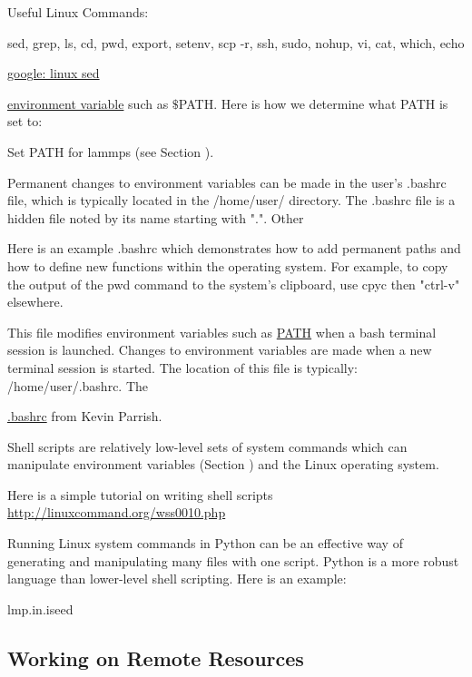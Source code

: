 Useful Linux Commands:

sed, grep, ls, cd, pwd, export, setenv, scp -r, ssh, sudo, nohup, 
vi, cat, which, echo

\href{https://www.google.com/search?q=linux+sed}
{google: linux sed} 


\href{http://en.wikipedia.org/wiki/Environment_variable}
{environment variable} such as $\$$PATH.  Here is how we determine what 
PATH is set to:


Set PATH for lammps (see Section ).


Permanent changes to environment variables can be made in the user's 
.bashrc file, which is typically located in the /home/user/ directory. 
The .bashrc file is a hidden file noted by its name starting with ".". 
Other

Here is an example .bashrc which demonstrates how to add permanent paths 
and how to define new functions within the operating system. 
For example, to copy the output of the pwd command to the system's 
clipboard, use cpyc then "ctrl-v" elsewhere. 

This file modifies environment variables such as 
\href{https://help.ubuntu.com/community/EnvironmentVariables}{PATH}  
when a bash terminal session is launched. Changes to environment 
variables are made when a new terminal session is started. The 
location of this file is typically: /home/user/.bashrc.  The 

\href{https://gist.github.com/kparrish/6064111}{.bashrc} from 
Kevin Parrish.


Shell scripts are relatively low-level sets of system commands 
which can manipulate environment variables (Section )   
and the Linux operating system. 

Here is a simple tutorial on writing shell scripts 
\href{http://linuxcommand.org/wss0010.php}
{http://linuxcommand.org/wss0010.php}

Running Linux system commands in Python can be an effective way of 
generating and manipulating many files with one script. Python 
is a more robust language than lower-level shell scripting. 
Here is an example:

lmp.in.iseed

\subsection{\label{A:Comp_Env:Remote}Working on Remote Resources}


